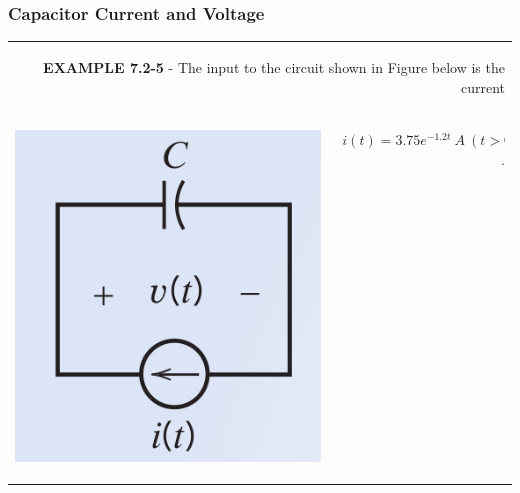 \documentclass[aspectratio=169]{beamer}
\begin{document}
\begin{frame}[fragile]
\frametitle{Capacitor Current and Voltage}
\begin{tabular}{r}

	    \begin{columns}
		\begin{column}{1\textwidth}
		\textbf{EXAMPLE 7.2-5} - The input to the circuit shown in Figure below is the current 
		\end{column}
	  \end{columns}\\
	    \begin{columns}
	    
	    	\begin{column}{.3\textwidth}  %
		    \begin{center}
    	  		\includegraphics[height=.7\textwidth]{figura11.png}	
		    \end{center}
		\end{column}
	    
		\begin{column}{.5\textwidth}
		  \begin{center} $i(t)=3.75e^{-1.2t} \ A \ (t>0)$.\end{center}
		\end{column}

	\end{columns}\\
	

\end{tabular}
\end{frame}
\end{document}
